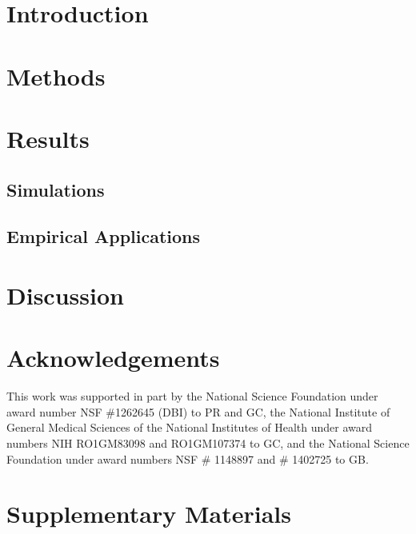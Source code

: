 \documentclass[12pt]{article}
\begin{document}


\newpage

\section*{Introduction}

\section*{Methods}

\section*{Results}

\subsection*{Simulations}

\subsection*{Empirical Applications}

\section*{Discussion}

\section*{Acknowledgements}

This work was supported in part by 
the National Science Foundation under award number NSF \#1262645 (DBI) to PR and GC, 
the National Institute of General Medical Sciences of the National Institutes of Health under award numbers NIH RO1GM83098 and RO1GM107374 to GC,
and the National Science Foundation under award numbers NSF \# 1148897 and \# 1402725 to GB.


\newpage

%

\newpage

\section*{Supplementary Materials}
\renewcommand{\thefigure}{S\arabic{figure}}
\setcounter{figure}{0}
\renewcommand{\thetable}{S\arabic{table}}
\setcounter{table}{0}
\renewcommand{\theequation}{S\arabic{table}}
\setcounter{equation}{0}
\end{document}
